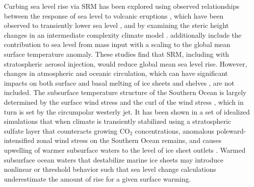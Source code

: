\documentclass[grl]{AGUTeX}  %
\begin{document}
\begin{article}
Curbing sea level rise via SRM has been explored using observed relationships between the response of sea level to volcanic eruptions \citep{moore10}, which have been observed to transiently lower sea level \citep{church05,gleckler06}, and by examining the steric height changes in an intermediate complexity climate model \citep{irvine12}. \citet{irvine12} additionally include the contribution to sea level from mass input with a scaling to the global mean surface temperature anomaly. These studies find that SRM, including with stratospheric aerosol injection, would reduce global mean sea level rise. However, changes in atmospheric and oceanic circulation, which can have significant impacts on both surface and basal melting of ice sheets and shelves \citep{steig13,joughin11,thoma08}, are not included. The subsurface temperature structure of the Southern Ocean is largely determined by the surface wind stress and the curl of the wind stress \citep{fyfe07}, which in turn is set by the circumpolar westerly jet. It has been shown in a set of idealized simulations that when climate is transiently stabilized using a stratospheric sulfate layer that counteracts growing CO$_2$ concentrations, anomalous poleward-intensified zonal wind stress on the Southern Ocean remains, and causes upwelling of warmer subsurface waters to the level of ice sheet outlets \citep{mccusker12}. Warmed subsurface ocean waters that destabilize marine ice sheets may introduce nonlinear or threshold behavior \citep{notz09} such that sea level change calculations underestimate the amount of rise for a given surface warming.



\end{article}
\end{document}
